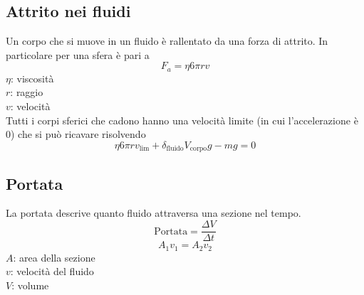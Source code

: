 \subsection{Attrito nei fluidi}
Un corpo che si muove in un fluido è rallentato da una forza di attrito. In particolare per una
sfera è pari a
\begin{equation*}
  F_a = \eta 6\pi rv
\end{equation*}
$\eta$: viscosità\\
$r$: raggio\\
$v$: velocità\\ [\baselineskip]
Tutti i corpi sferici che cadono hanno una velocità limite (in cui l'accelerazione è $0$) che si può
ricavare risolvendo
\begin{equation*}
  \eta6\pi rv_{\text{lim}}+\delta_{\text{fluido}}V_{\text{corpo}}g-mg=0
\end{equation*}

\begin{center}
\end{center}


\subsection{Portata}
La portata descrive quanto fluido attraversa una sezione nel tempo.
\begin{equation*}
  \text{Portata} = \frac{\Delta V}{\Delta t} 
\end{equation*}
\begin{equation*}
  A_1v_1=A_2v_2
\end{equation*}
$A$: area della sezione\\
$v$: velocità del fluido\\
$V$: volume

